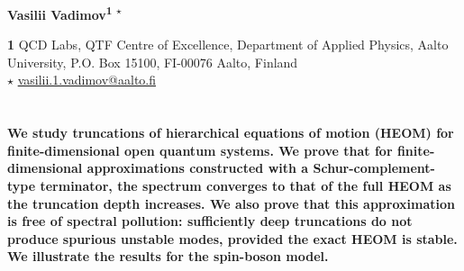 \documentclass{SciPost}
\begin{document}
\pagestyle{SPstyle}

\begin{center}{\Large \textbf{\color{scipostdeepblue}{
On truncations of hierarchical equations of motion for finite-dimensional systems\\
}}}\end{center}

\begin{center}\textbf{
Vasilii Vadimov\textsuperscript{1 $\star$}
}\end{center}


\begin{center}
{\bf 1}
QCD Labs, QTF Centre of Excellence, Department of Applied Physics, Aalto University, P.O. Box 15100, FI-00076 Aalto, Finland\\
$\star$ \href{mailto:vasilii.1.vadimov@aalto.fi}{\small vasilii.1.vadimov@aalto.fi}
\end{center}


\section*{\color{scipostdeepblue}{Abstract}}
\textbf{
    We study truncations of hierarchical equations of motion (HEOM) for finite-dimensional open quantum systems. We prove that for finite-dimensional approximations constructed with a Schur-complement-type terminator, the spectrum converges to that of the full HEOM as the truncation depth increases. We also prove that this approximation is free of spectral pollution: sufficiently deep truncations do not produce spurious unstable modes, provided the exact HEOM is stable. We illustrate the results for the spin-boson model.
}

\vspace{\baselineskip}
\end{document}
